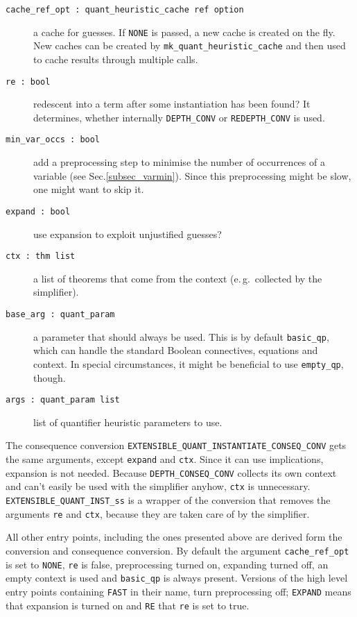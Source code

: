\documentclass[a4paper,12pt,DIV=12,oneside]{scrbook}
\theoremstyle{definition}
\theoremstyle{remark}
\begin{document}
\begin{description}
  \item[\texttt{cache\_ref\_opt\ :\ quant\_heuristic\_cache ref option}]
     a cache for guesses. If \texttt{NONE} is passed,
     a new cache is created on the fly. New caches can be created by \texttt{mk\_quant\_heuristic\_cache} and then
     used to cache results through multiple calls.
  \item[\texttt{re\ :\ bool}]  redescent into a term after some instantiation has been found?
     It determines, whether internally \texttt{DEPTH\_CONV} or \texttt{REDEPTH\_CONV} is used.

  \item[\texttt{min\_var\_occs\ :\ bool}]  add a preprocessing step to minimise the number of occurrences of 
    a variable (see Sec.\ref{subsec_varmin}). Since this preprocessing might be slow, one might want to skip it.

  \item[\texttt{expand\ :\ bool}]  use expansion to exploit unjustified guesses?

  \item[\texttt{ctx\ :\ thm list}]  a list of theorems that come from the context (e.\,g.\ collected by the simplifier).

  \item[\texttt{base\_arg\ :\ quant\_param}]  a parameter that should always be used. This is by default
   \texttt{basic\_qp}, which can handle the standard Boolean connectives, equations and context. In special circumstances,
     it might be beneficial to use \texttt{empty\_qp}, though.

  \item[\texttt{args\ :\ quant\_param list}]  list of quantifier heuristic parameters to use.
\end{description}

The consequence conversion
\texttt{EXTENSIBLE\_QUANT\_INSTANTIATE\_CONSEQ\_CONV} gets the same
arguments, except \texttt{expand} and \texttt{ctx}. Since it can use
implications, expansion is not needed. Because
\texttt{DEPTH\_CONSEQ\_CONV} collects its own context and can't easily
be used with the simplifier anyhow, \texttt{ctx} is unnecessary. 
\texttt{EXTENSIBLE\_QUANT\_INST\_ss} is a wrapper of the conversion that removes the arguments
\texttt{re} and \texttt{ctx}, because they are taken care of by the simplifier.

All other entry points, including the ones presented above are derived
form the conversion and consequence conversion. By default the argument
\texttt{cache\_ref\_opt} is set to \texttt{NONE}, \texttt{re} is false,
preprocessing turned on, expanding turned off, an empty context is used and
\texttt{basic\_qp} is always present. Versions of the high level entry points
containing \texttt{FAST} in their name, turn preprocessing off; \texttt{EXPAND} means that
expansion is turned on and \texttt{RE} that \texttt{re} is set to true.
\end{document}
